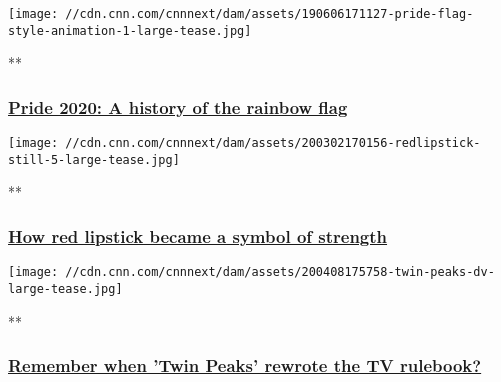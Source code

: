 \href{/videos/design/2019/06/06/rainbow-flag-pride-history-origins-lon-orig.cnn/video/playlists/cnn-style/}{}

\texttt{[image: //cdn.cnn.com/cnnnext/dam/assets/190606171127-pride-flag-style-animation-1-large-tease.jpg]}

**

\hypertarget{pride-2020-a-history-of-the-rainbow-flag}{%
\subsubsection{\texorpdfstring{\href{/videos/design/2019/06/06/rainbow-flag-pride-history-origins-lon-orig.cnn/video/playlists/cnn-style/}{Pride
2020: A history of the rainbow
flag}}{Pride 2020: A history of the rainbow flag}}\label{pride-2020-a-history-of-the-rainbow-flag}}

\href{/videos/beauty/2020/03/02/history-of-red-lipstick-suffrage-lon-orig.cnn/video/playlists/cnn-style/}{}

\texttt{[image: //cdn.cnn.com/cnnnext/dam/assets/200302170156-redlipstick-still-5-large-tease.jpg]}

**

\hypertarget{how-red-lipstick-became-a-symbol-of-strength}{%
\subsubsection{\texorpdfstring{\href{/videos/beauty/2020/03/02/history-of-red-lipstick-suffrage-lon-orig.cnn/video/playlists/cnn-style/}{How
red lipstick became a symbol of
strength}}{How red lipstick became a symbol of strength}}\label{how-red-lipstick-became-a-symbol-of-strength}}

\href{/videos/fashion/2020/04/08/twin-peaks-remember-when-lon-orig.cnn/video/playlists/cnn-style/}{}

\texttt{[image: //cdn.cnn.com/cnnnext/dam/assets/200408175758-twin-peaks-dv-large-tease.jpg]}

**

\hypertarget{remember-when-twin-peaks-rewrote-the-tv-rulebook}{%
\subsubsection{\texorpdfstring{\href{/videos/fashion/2020/04/08/twin-peaks-remember-when-lon-orig.cnn/video/playlists/cnn-style/}{Remember
when 'Twin Peaks' rewrote the TV
rulebook?}}{Remember when 'Twin Peaks' rewrote the TV rulebook?}}\label{remember-when-twin-peaks-rewrote-the-tv-rulebook}}

